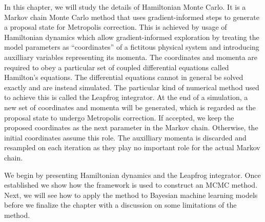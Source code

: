 In this chapter, we will study the details of Hamiltonian Monte Carlo. It is a Markov chain Monte Carlo method that uses gradient-informed
steps to generate a proposal state for Metropolis correction. This is achieved by usage of Hamiltonian dynamics
which allow gradient-informed exploration by treating the model parameters
as ``coordinates'' of a fictitous physical system and introducing auxilliary variables representing its momenta. 
The coordinates and momenta are required to obey a particular set of coupled differential equations called Hamilton's equations.
The differential equations cannot in general be solved exactly and are instead simulated. 
The particular kind of numerical method used to achieve this
is called the Leapfrog integrator. At the end of a simulation, a new set of coordinates and momenta 
will be generated,
which is regarded as the proposal state to undergo Metropolis correction.
If accepted, we keep the proposed coordinates as the next parameter in the Markov chain. Otherwise, the initial coordinates
assume this role. The auxilliary momenta is discarded and resampled on each iteration as they play no important role for the actual Markov chain.

We begin by presenting Hamiltonian dynamics and the Leapfrog integrator.
Once established we show how the framework is used to construct an MCMC method.
Next, we will see how to apply the method to Bayesian machine learning models before we finalize the
chapter with a discussion on some limitations of the method.



